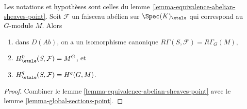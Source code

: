 \begin{lemma}
\label{lemma-compare-cohomology-point}
Les notations et hypoth\`eses sont celles du
lemme \ref{lemma-equivalence-abelian-sheaves-point}.
Soit $\mathcal{F}$ un faisceau ab\'elien sur $\Spec(K)_\etale$
qui correspond au $G$-module $M$.
Alors
\begin{enumerate}
\item dans $D(\textit{Ab})$, on a un isomorphisme canonique
$R\Gamma(S, \mathcal{F}) = R\Gamma_G(M)$,
\item $H_\etale^0(S, \mathcal{F}) = M^G$, et
\item $H_\etale^q(S, \mathcal{F}) = H^q(G, M)$.
\end{enumerate}
\end{lemma}

\begin{proof}
Combiner le
lemme \ref{lemma-equivalence-abelian-sheaves-point}
avec le
lemme \ref{lemma-global-sections-point}.
\end{proof}

